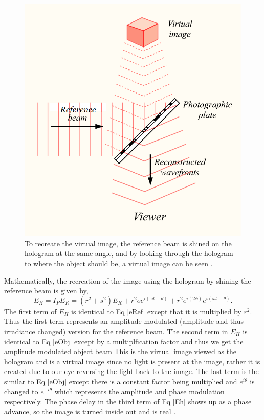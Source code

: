\documentclass[ notitlepage, numerical, 11pt]{revtex4-1} %
\begin{document}
\begin{figure}[H]
\centerline{\includegraphics[scale=.45]{reconstruct.png}}
\caption{To recreate the virtual image, the reference beam is shined on the hologram at the same angle, and by looking through the hologram to where the object should be, a virtual image can be seen \cite{wikiHolo}.}
\label{reconstruct}
\end{figure} 
Mathematically, the recreation of the image using the hologram by shining the reference beam is given by,
\begin{equation}
E_H =  I_P E_R = (r^2 +s ^2)E_R + r^2oe^{i(\omega t +\theta)} + r^2e^{i(2\phi)}e^{i(\omega t-\theta)}.
\label{Eh}
\end{equation}
The first term of $E_H$ is identical to Eq \ref{eRef} except that it is multiplied by $r^2$. Thus the first term represents an amplitude modulated (amplitude and thus irradiance changed) version for the reference beam. The second term in $E_H$ is identical to Eq \ref{eObj} except by a multiplfication factor and thus we get the amplitude modulated object beam This is the virtual image viewed as the hologram and is a virtual image since no light is present at the image, rather it is created due to our eye reversing the light back to the image. The last term is the similar to Eq \ref{eObj} except there is a constant factor being multiplied and $e^{i\theta}$ is changed to $e^{-i\theta}$ which represents the amplitude and phase modulation respectively. The phase delay in the third term of Eq \ref{Eh} shows up as a phase advance, so the image is turned inside out and is real \cite{optics}. 
\end{document}
